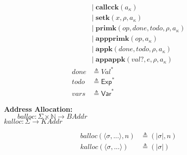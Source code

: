 \documentclass[12pt,draft]{article}
\newcommand{\env}[0]{\rho}
\newcommand{\kaddr}[0]{a_{\kappa}}
\begin{document}
{\begin{multicols*}{2}
\begin{align*}
                     &|\; \textbf{callcck}(\kaddr) \\
                     &|\; \textbf{setk}(x, \env, \kaddr) \\
                     &|\; \textbf{primk}(op, done, todo, \env, \kaddr) \\
                     &|\; \textbf{appprimk}(op, \kaddr) \\
                     &|\; \textbf{appk}(done, todo, \env , \kaddr) \\
                     &|\; \textbf{appappk}(val?, e, \env , \kaddr) \\
  done &\triangleq \textit{Val}^\ast \\
  todo &\triangleq \textsf{Exp}^* \\
  vars &\triangleq \textsf{Var}^*
\end{align*}
\begin{center}
  \textbf{Address Allocation:} \\
  $\;\;\;\;\;\;\;balloc : \Sigma \times \mathbb{N} \rightarrow \textit{BAddr}$ \\
  $kalloc : \Sigma \rightarrow \textit{KAddr}$
\end{center}
\vspace{-6mm}
\begin{align*}
  balloc(\langle \sigma , ... \rangle, n) &\triangleq (|\sigma| , n) \\
  kalloc(\langle \sigma , ... \rangle) &\triangleq (|\sigma|)
\end{align*}
\end{multicols*}
}

\newpage
\end{document}
